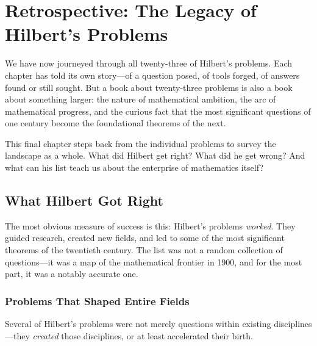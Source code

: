 
\chapter*{Retrospective: The Legacy of Hilbert's Problems}

We have now journeyed through all twenty-three of Hilbert's problems. Each chapter has told its own story---of a question posed, of tools forged, of answers found or still sought. But a book about twenty-three problems is also a book about something larger: the nature of mathematical ambition, the arc of mathematical progress, and the curious fact that the most significant questions of one century become the foundational theorems of the next.

This final chapter steps back from the individual problems to survey the landscape as a whole. What did Hilbert get right? What did he get wrong? And what can his list teach us about the enterprise of mathematics itself?

\section{What Hilbert Got Right}

The most obvious measure of success is this: Hilbert's problems \emph{worked}. They guided research, created new fields, and led to some of the most significant theorems of the twentieth century. The list was not a random collection of questions---it was a map of the mathematical frontier in 1900, and for the most part, it was a notably accurate one.

\subsection{Problems That Shaped Entire Fields}

Several of Hilbert's problems were not merely questions within existing disciplines---they \emph{created} those disciplines, or at least accelerated their birth.

